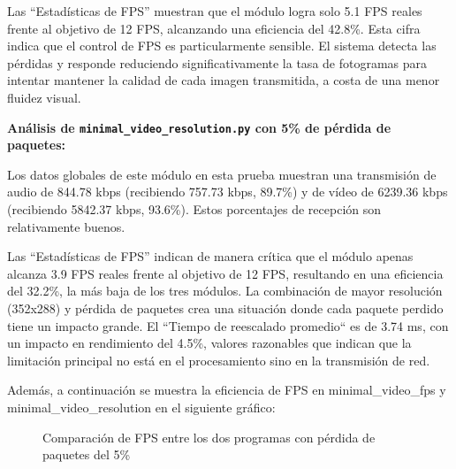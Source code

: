 Las ``Estadísticas de FPS'' muestran que el módulo logra solo 5.1 FPS reales frente al objetivo de 12 FPS, alcanzando una eficiencia del 42.8\%. Esta cifra indica que el control de FPS es particularmente sensible. El sistema detecta las pérdidas y responde reduciendo significativamente la tasa de fotogramas para intentar mantener la calidad de cada imagen transmitida, a costa de una menor fluidez visual.

\vspace{\baselineskip}

\textbf{Análisis de \texttt{minimal\_video\_resolution.py} con 5\% de pérdida de paquetes:}
\vspace{\baselineskip}

Los datos globales de este módulo en esta prueba muestran una transmisión de audio de 844.78 kbps (recibiendo 757.73 kbps, 89.7\%) y de vídeo de 6239.36 kbps (recibiendo 5842.37 kbps, 93.6\%). Estos porcentajes de recepción son relativamente buenos.
\vspace{\baselineskip}

Las ``Estadísticas de FPS'' indican de manera crítica que el módulo apenas alcanza 3.9 FPS reales frente al objetivo de 12 FPS, resultando en una eficiencia del 32.2\%, la más baja de los tres módulos. La combinación de mayor resolución (352x288) y pérdida de paquetes crea una situación donde cada paquete perdido tiene un impacto grande. El ``Tiempo de reescalado promedio`` es de 3.74 ms, con un impacto en rendimiento del 4.5\%, valores razonables que indican que la limitación principal no está en el procesamiento sino en la transmisión de red.

\vspace{\baselineskip}

Además, a continuación se muestra la eficiencia de FPS en minimal\_video\_fps y minimal\_video\_resolution en el siguiente gráfico:
\begin{figure}[H]
\centering
{}
\caption{Comparación de FPS entre los dos programas con pérdida de paquetes del 5\%}
\label{fig:comparacionfps_5pct}
\end{figure}

